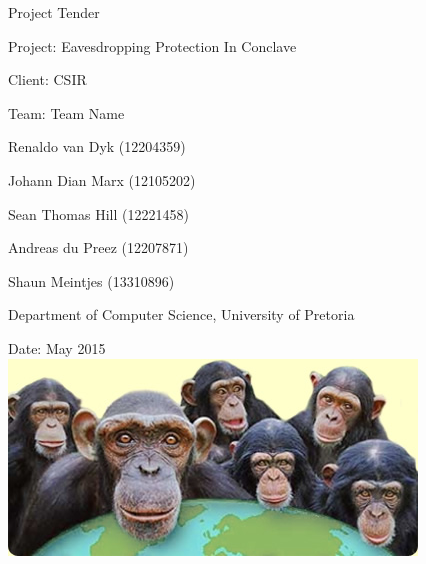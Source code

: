 \documentclass[12pt, oneside]{article}
\begin{document}
\thispagestyle{empty}
\begin{center}
\begin{minipage}{0.9\linewidth}
    \centering


    {\normalsize Project Tender\par}
    \vspace{1cm}
    {\Large Project: Eavesdropping Protection In Conclave\par}
{\normalsize Client: CSIR\par}
    \vspace{1cm}
   {\Large Team: Team Name\par}
    {\normalsize Renaldo van Dyk (12204359)\par}
    {\normalsize Johann Dian Marx (12105202)\par}
    {\normalsize Sean Thomas Hill (12221458)\par}
    {\normalsize Andreas du Preez (12207871)\par}
    {\normalsize Shaun Meintjes (13310896)\par}
{\normalsize Department of Computer Science, University of Pretoria\par}
    \vspace{1cm}

 {\normalsize Date: May 2015}
\vspace{1cm}
    \includegraphics[scale=0.9]{example1} %

    \vspace{1cm}
    
\end{minipage}
\end{center}
\clearpage

\newpage
\end{document}
